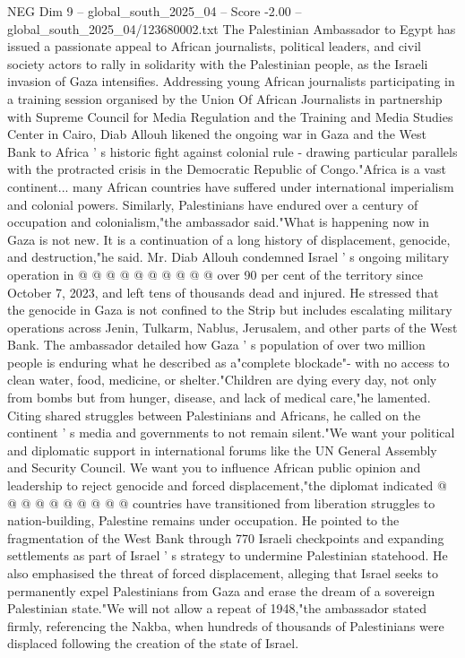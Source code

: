 \begin{textsample}{NEG Dim 9 – global\_south\_2025\_04 – Score -2.00 – global\_south\_2025\_04/123680002.txt}  \label{ex:f9_neg_274}
The Palestinian Ambassador to Egypt has issued a passionate appeal to African journalists, political leaders, and civil society actors to rally in solidarity with the Palestinian people, as the Israeli invasion of Gaza intensifies.
Addressing young African journalists participating in a training session organised by the Union Of African Journalists in partnership with Supreme Council for Media Regulation and the Training and Media Studies Center in Cairo, Diab Allouh likened the ongoing war in Gaza and the West Bank to Africa ' s historic fight against colonial rule - drawing particular parallels with the protracted crisis in the Democratic Republic of Congo."Africa is a vast continent... many African countries have suffered under international imperialism and colonial powers.
Similarly, Palestinians have endured over a century of occupation and colonialism,"the ambassador said."What is happening now in Gaza is not new.
It is a continuation of a long history of displacement, genocide, and destruction,"he said.
Mr.
Diab Allouh condemned Israel ' s ongoing military operation in @ @ @ @ @ @ @ @ @ @ over 90 per cent of the territory since October 7, 2023, and left tens of thousands dead and injured.
He stressed that the genocide in Gaza is not confined to the Strip but includes escalating military operations across Jenin, Tulkarm, Nablus, Jerusalem, and other parts of the West Bank.
The ambassador detailed how Gaza ' s population of over two million people is enduring what he described as a"complete blockade"- with no access to clean water, food, medicine, or shelter."Children are dying every day, not only from bombs but from hunger, disease, and lack of medical care,"he lamented.
Citing shared struggles between Palestinians and Africans, he called on the continent ' s media and governments to not remain silent."We want your political and diplomatic support in international forums like the UN General Assembly and Security Council.
We want you to influence African public opinion and leadership to reject genocide and forced displacement,"the diplomat indicated @ @ @ @ @ @ @ @ @ @ countries have transitioned from liberation struggles to nation-building, Palestine remains under occupation.
He pointed to the fragmentation of the West Bank through 770 Israeli checkpoints and expanding settlements as part of Israel ' s strategy to undermine Palestinian statehood.
He also emphasised the threat of forced displacement, alleging that Israel seeks to permanently expel Palestinians from Gaza and erase the dream of a sovereign Palestinian state."We will not allow a repeat of 1948,"the ambassador stated firmly, referencing the Nakba, when hundreds of thousands of Palestinians were displaced following the creation of the state of Israel.

\end{textsample}
